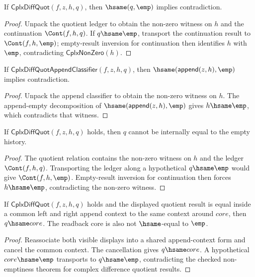 \begin{theorem}
\label{thm:cplx-diff-quot-result-not-empty}
If $\mathsf{CplxDiffQuot}(f,z,h,q)$, then $\hsame(q,\emp)$ implies
contradiction.
\end{theorem}
\begin{proof}
Unpack the quotient ledger to obtain the non-zero witness on $h$ and the
continuation $\Cont(f,h,q)$. If $q\hsame\emp$, transport the continuation
result to $\Cont(f,h,\emp)$; empty-result inversion for continuation then
identifies $h$ with $\emp$, contradicting $\mathsf{CplxNonZero}(h)$.
\end{proof}

\begin{theorem}
\label{thm:cplx-diff-quot-append-target-not-empty}
If $\mathsf{CplxDiffQuotAppendClassifier}(f,z,h,q)$, then
$\hsame(\mathsf{append}(z,h),\emp)$ implies contradiction.
\end{theorem}
\begin{proof}
Unpack the append classifier to obtain the non-zero witness on $h$. The
append-empty decomposition of
$\hsame(\mathsf{append}(z,h),\emp)$ gives $h\hsame\emp$, which contradicts
that witness.
\end{proof}

\begin{lemma}
\label{lem:cplx-diff-quot-result-nonempty}
If $\mathsf{CplxDiffQuot}(f,z,h,q)$ holds, then $q$ cannot be internally
equal to the empty history.
\end{lemma}
\begin{proof}
The quotient relation contains the non-zero witness on $h$ and the ledger
$\Cont(f,h,q)$. Transporting the ledger along a hypothetical $q\hsame\emp$
would give $\Cont(f,h,\emp)$. Empty-result inversion for continuation then
forces $h\hsame\emp$, contradicting the non-zero witness.
\end{proof}

\begin{theorem}
\label{thm:cplx-diff-quot-result-visible-context-readback}
If $\mathsf{CplxDiffQuot}(f,z,h,q)$ holds and the displayed quotient result is
equal inside a common left and right append context to the same context around
$core$, then $q\hsame core$. The readback core is also not
$\hsame$-equal to $\emp$.
\end{theorem}
\begin{proof}
Reassociate both visible displays into a shared append-context form and cancel
the common context. The cancellation gives $q\hsame core$. A hypothetical
$core\hsame\emp$ transports to $q\hsame\emp$, contradicting the checked
non-emptiness theorem for complex difference quotient results.
\end{proof}

